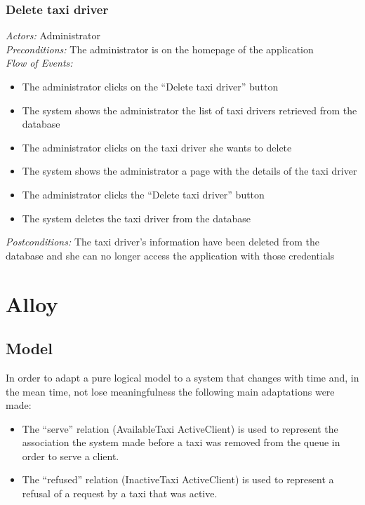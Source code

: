 \documentclass{article}
\begin{document}
\subsubsection{Delete taxi driver}
\textit{Actors:} Administrator
\\\textit{Preconditions:} The administrator is on the homepage of the application
\\\textit{Flow of Events:}
\begin{itemize}
	\item  The administrator clicks on the ``Delete taxi driver'' button
	\item  The system shows the administrator the list of taxi drivers retrieved from the database
	\item  The administrator clicks on the taxi driver she wants to delete
	\item  The system shows the administrator a page with the details of the taxi driver
	\item  The administrator clicks the ``Delete taxi driver'' button
	\item  The system deletes the taxi driver from the database
\end{itemize}
\textit{Postconditions:} The taxi driver's information have been deleted from the database and she can no longer access the application with those credentials
\clearpage
\section{Alloy}
\subsection{Model}
In order to adapt a pure logical model to a system that changes with time and, in the mean time, not lose meaningfulness the following
main adaptations were made:
\begin{itemize}
	\item The ``serve'' relation (AvailableTaxi \textrightarrow\-ActiveClient) is used to represent the association the system made before a taxi was removed from the queue in order to serve a client.
	\item The ``refused'' relation (InactiveTaxi \textrightarrow\-ActiveClient) is used to represent a refusal of a request by a taxi that was active.
\end{itemize}
\texttt{}	
\end{document}
